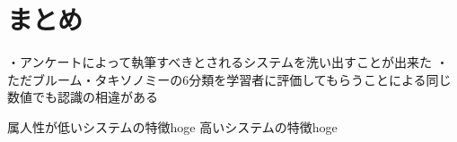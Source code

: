\section{まとめ}

・アンケートによって執筆すべきとされるシステムを洗い出すことが出来た
・ただブルーム・タキソノミーの6分類を学習者に評価してもらうことによる同じ数値でも認識の相違がある


属人性が低いシステムの特徴hoge
高いシステムの特徴hoge

